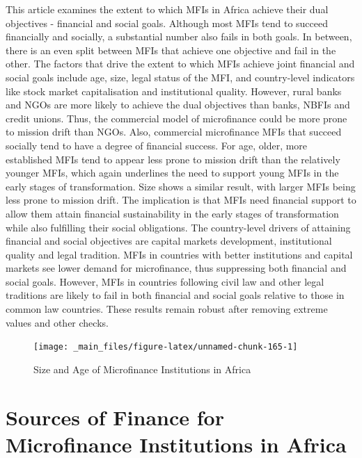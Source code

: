 \documentclass[a4paper, nobind]{templates/ociamthesis}
\begin{document}
This article examines the extent to which MFIs in Africa achieve their dual objectives - financial and social goals. Although most MFIs tend to succeed financially and socially, a substantial number also fails in both goals. In between, there is an even split between MFIs that achieve one objective and fail in the other. The factors that drive the extent to which MFIs achieve joint financial and social goals include age, size, legal status of the MFI, and country-level indicators like stock market capitalisation and institutional quality. However, rural banks and NGOs are more likely to achieve the dual objectives than banks, NBFIs and credit unions. Thus, the commercial model of microfinance could be more prone to mission drift than NGOs. Also, commercial microfinance MFIs that succeed socially tend to have a degree of financial success. For age, older, more established MFIs tend to appear less prone to mission drift than the relatively younger MFIs, which again underlines the need to support young MFIs in the early stages of transformation. Size shows a similar result, with larger MFIs being less prone to mission drift. The implication is that MFIs need financial support to allow them attain financial sustainability in the early stages of transformation while also fulfilling their social obligations. The country-level drivers of attaining financial and social objectives are capital markets development, institutional quality and legal tradition. MFIs in countries with better institutions and capital markets see lower demand for microfinance, thus suppressing both financial and social goals. However, MFIs in countries following civil law and other legal traditions are likely to fail in both financial and social goals relative to those in common law countries. These results remain robust after removing extreme values and other checks.

\begin{landscape}

\begin{figure}

{\centering \texttt{[image: \_main\_files/figure-latex/unnamed-chunk-165-1]} 

}

\caption{Size and Age of Microfinance Institutions in Africa}\label{fig:unnamed-chunk-165}
\end{figure}

\end{landscape}

\newpage

\hypertarget{Introduction}{%
\chapter{Sources of Finance for Microfinance Institutions in Africa}\label{Introduction}}
\end{document}
